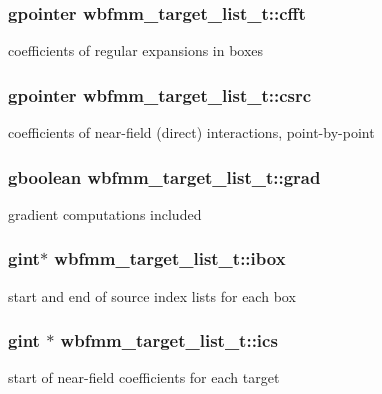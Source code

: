 \subsubsection[{cfft}]{\setlength{\rightskip}{0pt plus 5cm}gpointer wbfmm\+\_\+target\+\_\+list\+\_\+t\+::cfft}\label{structwbfmm__target__list__t_a12bb5b8d5d13858490facfb5ba8c194c}
coefficients of regular expansions in boxes 
\subsubsection[{csrc}]{\setlength{\rightskip}{0pt plus 5cm}gpointer wbfmm\+\_\+target\+\_\+list\+\_\+t\+::csrc}\label{structwbfmm__target__list__t_ada73422907fc27f3ef9c28bf138a9771}
coefficients of near-\/field (direct) interactions, point-\/by-\/point 
\subsubsection[{grad}]{\setlength{\rightskip}{0pt plus 5cm}gboolean wbfmm\+\_\+target\+\_\+list\+\_\+t\+::grad}\label{structwbfmm__target__list__t_ad11d85c28d4ea1a81adf6c53dad621e2}
gradient computations included 
\subsubsection[{ibox}]{\setlength{\rightskip}{0pt plus 5cm}gint$\ast$ wbfmm\+\_\+target\+\_\+list\+\_\+t\+::ibox}\label{structwbfmm__target__list__t_a6d627c8decc0eb9c51a967ec88a5217c}
start and end of source index lists for each box 
\subsubsection[{ics}]{\setlength{\rightskip}{0pt plus 5cm}gint $\ast$ wbfmm\+\_\+target\+\_\+list\+\_\+t\+::ics}\label{structwbfmm__target__list__t_a891463ff38b81ace58270087c28187e7}
start of near-\/field coefficients for each target 

